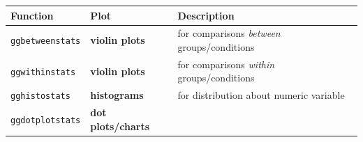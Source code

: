 \documentclass[]{article}
\begin{document}
\begin{longtable}[]{@{}lll@{}}
\toprule
\begin{minipage}[b]{0.17\columnwidth}\raggedright
Function\strut
\end{minipage} & \begin{minipage}[b]{0.25\columnwidth}\raggedright
Plot\strut
\end{minipage} & \begin{minipage}[b]{0.49\columnwidth}\raggedright
Description\strut
\end{minipage}\tabularnewline
\midrule
\endhead
\begin{minipage}[t]{0.17\columnwidth}\raggedright
\texttt{ggbetweenstats}\strut
\end{minipage} & \begin{minipage}[t]{0.25\columnwidth}\raggedright
\textbf{violin plots}\strut
\end{minipage} & \begin{minipage}[t]{0.49\columnwidth}\raggedright
for comparisons \emph{between} groups/conditions\strut
\end{minipage}\tabularnewline
\begin{minipage}[t]{0.17\columnwidth}\raggedright
\texttt{ggwithinstats}\strut
\end{minipage} & \begin{minipage}[t]{0.25\columnwidth}\raggedright
\textbf{violin plots}\strut
\end{minipage} & \begin{minipage}[t]{0.49\columnwidth}\raggedright
for comparisons \emph{within} groups/conditions\strut
\end{minipage}\tabularnewline
\begin{minipage}[t]{0.17\columnwidth}\raggedright
\texttt{gghistostats}\strut
\end{minipage} & \begin{minipage}[t]{0.25\columnwidth}\raggedright
\textbf{histograms}\strut
\end{minipage} & \begin{minipage}[t]{0.49\columnwidth}\raggedright
for distribution about numeric variable\strut
\end{minipage}\tabularnewline
\begin{minipage}[t]{0.17\columnwidth}\raggedright
\texttt{ggdotplotstats}\strut
\end{minipage} & \begin{minipage}[t]{0.25\columnwidth}\raggedright
\textbf{dot plots/charts}\strut
\end{minipage} & \begin{minipage}[t]{0.49\columnwidth}\raggedright

\end{minipage}
\end{longtable}
\end{document}
